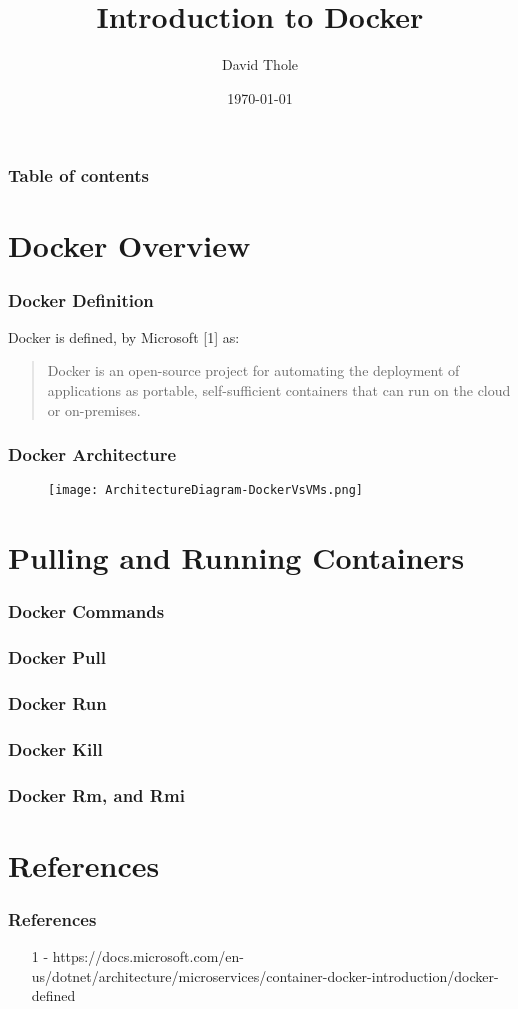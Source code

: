 \documentclass{beamer}
\begin{document}
\title{Introduction to Docker}
\author{David Thole}
\date{\today} 
\begin{frame}
\titlepage
\end{frame}

\begin{frame}\frametitle{Table of contents}\tableofcontents
\end{frame} 


\section{Docker Overview}
\begin{frame}\frametitle{Docker Definition}
  Docker is defined, by Microsoft \small{[1]} as:
  \begin{quote}
    Docker is an open-source project for automating the deployment of applications as portable, self-sufficient containers that can run on the cloud or on-premises.
  \end{quote}
\end{frame}
\begin{frame}\frametitle{Docker Architecture}
  \begin{figure}
    \texttt{[image: ArchitectureDiagram-DockerVsVMs.png]}
  \end{figure}
\end{frame}

\section{Pulling and Running Containers}
\begin{frame}\frametitle{Docker Commands}

\end{frame}

\begin{frame}\frametitle{Docker Pull}
\end{frame}

\begin{frame}\frametitle{Docker Run}
\end{frame}

\begin{frame}\frametitle{Docker Kill}
\end{frame}

\begin{frame}\frametitle{Docker Rm, and Rmi}
\end{frame}

\section{References}
\begin{frame}\frametitle{References}
  \begin{itemize}
    \item [1] - https://docs.microsoft.com/en-us/dotnet/architecture/microservices/container-docker-introduction/docker-defined
  \end{itemize}
\end{frame}
\end{document}
